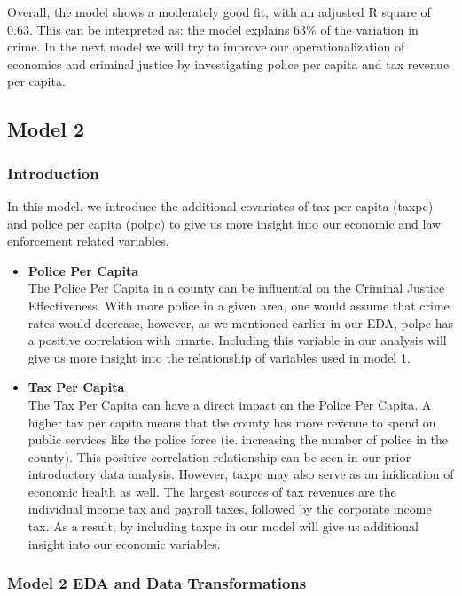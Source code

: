 \documentclass[]{article}
\begin{document}
Overall, the model shows a moderately good fit, with an adjusted R
square of 0.63. This can be interpreted as: the model explains 63\% of
the variation in crime. In the next model we will try to improve our
operationalization of economics and criminal justice by investigating
police per capita and tax revenue per capita.

\hypertarget{model-2}{%
\subsection{Model 2}\label{model-2}}

\hypertarget{introduction-2}{%
\subsubsection{Introduction}\label{introduction-2}}

In this model, we introduce the additional covariates of tax per capita
(taxpc) and police per capita (polpc) to give us more insight into our
economic and law enforcement related variables.

\begin{itemize}
\item
  \textbf{Police Per Capita}\\
  The Police Per Capita in a county can be influential on the Criminal
  Justice Effectiveness. With more police in a given area, one would
  assume that crime rates would decrease, however, as we mentioned
  earlier in our EDA, polpc has a positive correlation with crmrte.
  Including this variable in our analysis will give us more insight into
  the relationship of variables used in model 1.
\item
  \textbf{Tax Per Capita}\\
  The Tax Per Capita can have a direct impact on the Police Per Capita.
  A higher tax per capita means that the county has more revenue to
  spend on public services like the police force (ie. increasing the
  number of police in the county). This positive correlation
  relationship can be seen in our prior introductory data analysis.
  However, taxpc may also serve as an inidication of economic health as
  well. The largest sources of tax revenues are the individual income
  tax and payroll taxes, followed by the corporate income tax. As a
  result, by including taxpc in our model will give us additional
  insight into our economic variables.
\end{itemize}

\hypertarget{model-2-eda-and-data-transformations}{%
\subsubsection{Model 2 EDA and Data
Transformations}\label{model-2-eda-and-data-transformations}}
\end{document}
